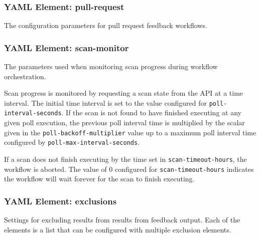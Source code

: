 \subsubsection{YAML Element: pull-request}\label{sec:yaml-feedback-pull-request}
The configuration parameters for pull request feedback workflows.

\subsubsection{YAML Element: scan-monitor}\label{sec:yaml-feedback-scan-monitor}
The parameters used when monitoring scan progress during workflow orchestration. 

Scan progress is monitored by requesting a scan state from the \cxone API at
a time interval.  The initial time interval is set to the value configured for
\texttt{poll-interval-seconds}.  If the scan is not found to have finished executing
at any given poll execution, the previous poll interval time is multiplied by
the scalar given in the \texttt{poll-backoff-multiplier} value up to a maximum
poll interval time configured by \texttt{poll-max-interval-seconds}.

If a scan does not finish executing by the time set in \texttt{scan-timeout-hours}, the
workflow is aborted.  The value of 0 configured for \texttt{scan-timeout-hours} indicates
the workflow will wait forever for the scan to finish executing.

\subsubsection{YAML Element: exclusions}\label{sec:yaml-feedback-exclusions}
Settings for excluding results from results from feedback output.  Each of the elements is a list that 
can be configured with multiple exclusion elements.
